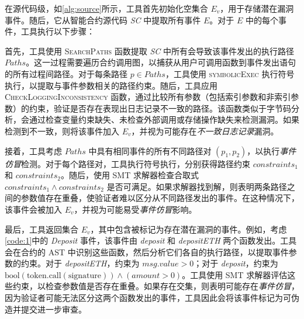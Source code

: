 在源代码级，如\cref{alg:source}所示，工具首先初始化空集合 \(E_v\)，用于存储潜在漏洞事件。随后，它从智能合约源代码 \textit{SC} 中提取所有事件 \(E\)。对于 \(E\) 中的每个事件，工具执行以下步骤：

首先，工具使用 \textsc{SearchPaths} 函数提取 \textit{SC} 中所有会导致该事件发出的执行路径 \(Paths\)。这一过程需要遍历合约调用图，以捕获从用户可调用函数到事件发出语句的所有过程间路径。对于每条路径 \(p \in Paths\)，工具使用 \textsc{symbolicExec} 执行符号执行，以提取与事件参数相关的路径约束。随后，工具应用 \textsc{CheckLoggingInconsistency} 函数，通过比较所有参数（包括索引参数和非索引参数）的约束，验证是否存在表现出日志记录不一致的路径。该函数类似于字节码分析，会通过检查变量约束缺失、未检查外部调用或存储操作缺失来检测漏洞。如果检测到不一致，则将该事件加入 \(E_v\)，并视为可能存在\emph{不一致日志记录}漏洞。

接着，工具考虑 \(Paths\) 中具有相同事件的所有不同路径对 \((p_1, p_2)\)，以执行\emph{事件仿冒}检测。对于每个路径对，工具执行符号执行，分别获得路径约束 \(constraints_1\) 和 \(constraints_2\)。随后，使用 SMT 求解器检查合取式 \(constraints_1 \land constraints_2\) 是否可满足。如果求解器找到解，则表明两条路径之间的参数值存在重叠，使验证者难以区分从不同路径发出的事件。在这种情况下，该事件会被加入 \(E_v\)，并视为可能易受\emph{事件仿冒}影响。

最后，工具返回集合 \(E_v\)，其中包含被标记为存在潜在漏洞的事件。例如，考虑\cref{code:1}中的 \emph{Deposit} 事件，该事件由 \emph{deposit} 和 \emph{depositETH} 两个函数发出。工具会在合约的 AST 中识别这些函数，然后分析它们各自的执行路径，以提取事件参数的约束。对于 \emph{depositETH}，约束为 \(msg.value > 0\)；对于 \emph{deposit}，约束为 \(\text{bool}(\text{token.call}(\text{signature})) \land (amount > 0)\)。工具使用 SMT 求解器评估这些约束，以检查参数值是否存在重叠。如果存在交集，则表明可能存在\emph{事件仿冒}，因为验证者可能无法区分这两个函数发出的事件，工具因此会将该事件标记为可伪造并提交进一步审查。
